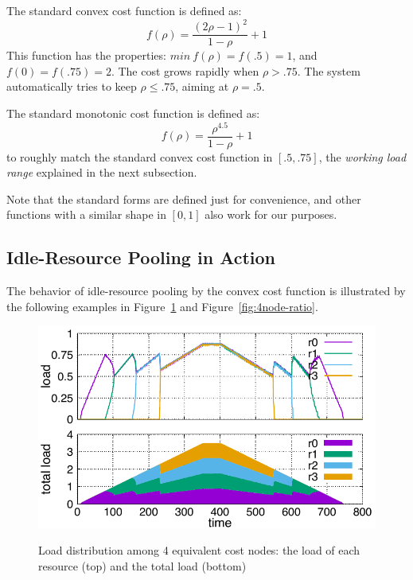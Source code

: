 The standard convex cost function is defined as:
\begin{equation*}
	f(\rho) = \frac{(2\rho - 1)^{2}}{1 - \rho} + 1
\end{equation*}
This function has the properties:
$min\: f(\rho) = f(.5) = 1$, and $f(0) = f(.75) = 2$.
The cost grows rapidly when $\rho > .75$.
The system automatically tries to keep $\rho \le .75$,
aiming at $\rho = .5$.

The standard monotonic cost function is defined as:
\begin{equation*}
	f(\rho) = \frac{\rho^{4.5}}{1 - \rho} + 1
\end{equation*}
to roughly match the standard convex cost function in $[.5, .75]$,
the {\em working load range} explained in the next subsection.

Note that the standard forms are defined just for convenience, and
other functions with a similar shape in $[0,1]$ also work for our
purposes.

\subsection{Idle-Resource Pooling in Action}

The behavior of idle-resource pooling by the convex cost function is
illustrated by the following examples in Figure~\ref{fig:4node} and
Figure~\ref{fig:4node-ratio}.

\begin{figure}[tb]
  \begin{center}
    \includegraphics[width=1.0\columnwidth]{4node.pdf}
    \vspace{-2.0ex}
    \caption{Load distribution among 4 equivalent cost nodes:
    the load of each resource (top) and the total load (bottom)}
    \label{fig:4node}
  \end{center}
  \hspace{0.8\columnsep}
\end{figure}

